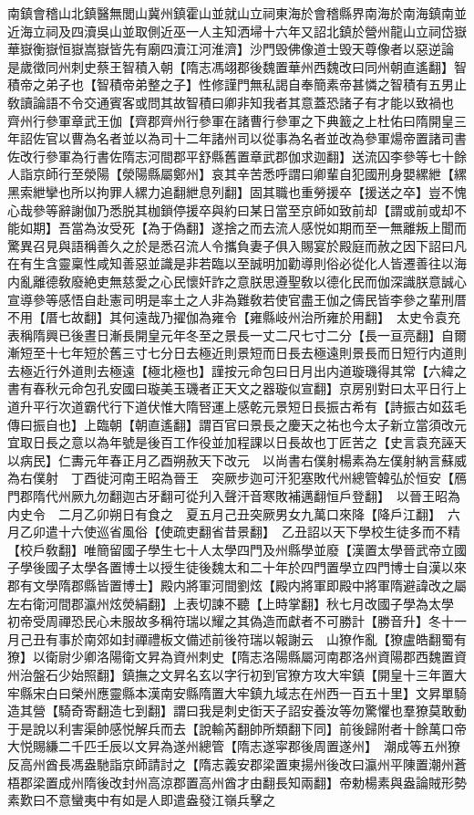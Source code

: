 南鎮會稽山北鎮醫無閭山冀州鎮霍山並就山立祠東海於會稽縣界南海於南海鎮南並近海立祠及四瀆吳山並取側近巫一人主知洒埽十六年又詔北鎮於營州龍山立祠岱嶽華嶽衡嶽恒嶽嵩嶽皆先有廟四瀆江河淮濟】沙門毁佛像道士毁天尊像者以惡逆論　是歲徵同州刺史蔡王智積入朝【隋志馮翊郡後魏置華州西魏改曰同州朝直遙翻】智積帝之弟子也【智積帝弟整之子】性修謹門無私謁自奉簡素帝甚憐之智積有五男止敎讀論語不令交通賓客或問其故智積曰卿非知我者其意蓋恐諸子有才能以致禍也　齊州行參軍章武王伽【齊郡齊州行參軍在諸曹行參軍之下典籖之上杜佑曰隋開皇三年詔佐官以曹為名者並以為司十二年諸州司以從事為名者並改為參軍煬帝置諸司書佐改行參軍為行書佐隋志河間郡平舒縣舊置章武郡伽求迦翻】送流囚李參等七十餘人詣京師行至滎陽【滎陽縣屬鄭州】哀其辛苦悉呼謂曰卿輩自犯國刑身嬰縲紲【縲黑索紲攣也所以拘罪人縲力追翻紲息列翻】固其職也重勞援卒【援送之卒】豈不愧心哉參等辭謝伽乃悉脱其枷鎖停援卒與約曰某日當至京師如致前却【謂或前或却不能如期】吾當為汝受死【為于偽翻】遂捨之而去流人感悦如期而至一無離叛上聞而驚異召見與語稱善久之於是悉召流人令攜負妻子俱入賜宴於殿庭而赦之因下詔曰凡在有生含靈稟性咸知善惡並識是非若臨以至誠明加勸導則俗必從化人皆遷善往以海内亂離德敎廢絶吏無慈愛之心民懷奸詐之意朕思遵聖敎以德化民而伽深識朕意誠心宣導參等感悟自赴憲司明是率土之人非為難敎若使官盡王伽之儔民皆李參之輩刑厝不用【厝七故翻】其何遠哉乃擢伽為雍令【雍縣岐州治所雍於用翻】　太史令袁充表稱隋興已後晝日漸長開皇元年冬至之景長一丈二尺七寸二分【長一亘亮翻】自爾漸短至十七年短於舊三寸七分日去極近則景短而日長去極遠則景長而日短行内道則去極近行外道則去極遠【極北極也】謹按元命包曰日月出内道璇璣得其常【六緯之書有春秋元命包孔安國曰璇美玉璣者正天文之器璇似宣翻】京房别對曰太平日行上道升平行次道霸代行下道伏惟大隋唘運上感乾元景短日長振古希有【詩振古如茲毛傳曰振自也】上臨朝【朝直遙翻】謂百官曰景長之慶天之祐也今太子新立當須改元宜取日長之意以為年號是後百工作役並加程課以日長故也丁匠苦之【史言袁充誣天以病民】仁夀元年春正月乙酉朔赦天下改元　以尚書右僕射楊素為左僕射納言蘇威為右僕射　丁酉徙河南王昭為晉王　突厥步迦可汗犯塞敗代州總管韓弘於恒安【鴈門郡隋代州厥九勿翻迦古牙翻可從刋入聲汗音寒敗補邁翻恒戶登翻】　以晉王昭為内史令　二月乙卯朔日有食之　夏五月己丑突厥男女九萬口來降【降戶江翻】　六月乙卯遣十六使巡省風俗【使疏吏翻省昔景翻】　乙丑詔以天下學校生徒多而不精【校戶敎翻】唯簡留國子學生七十人太學四門及州縣學並廢【漢置太學晉武帝立國子學後國子太學各置博士以授生徒後魏太和二十年於四門置學立四門博士自漢以來郡有文學隋郡縣皆置博士】殿内將軍河間劉炫【殿内將軍即殿中將軍隋避諱改之屬左右衛河間郡瀛州炫熒絹翻】上表切諫不聽【上時掌翻】秋七月改國子學為太學　初帝受周禪恐民心未服故多稱符瑞以耀之其偽造而獻者不可勝計【勝音升】冬十一月己丑有事於南郊如封禪禮板文備述前後符瑞以報謝云　山獠作亂【獠盧皓翻蜀有獠】以衛尉少卿洛陽衛文昇為資州刺史【隋志洛陽縣屬河南郡洛州資陽郡西魏置資州治盤石少始照翻】鎮撫之文昇名玄以字行初到官獠方攻大牢鎮【開皇十三年置大牢縣宋白曰榮州應靈縣本漢南安縣隋置大牢鎮九域志在州西一百五十里】文昇單騎造其營【騎奇寄翻造七到翻】謂曰我是刺史衘天子詔安養汝等勿驚懼也羣獠莫敢動于是說以利害渠帥感悦解兵而去【說輸芮翻帥所類翻下同】前後歸附者十餘萬口帝大悦賜縑二千匹壬辰以文昇為遂州總管【隋志遂寜郡後周置遂州】　潮成等五州獠反高州酋長馮盎馳詣京師請討之【隋志義安郡梁置東揚州後改曰瀛州平陳置潮州蒼梧郡梁置成州隋後改封州高涼郡置高州酋才由翻長知兩翻】帝勅楊素與盎論賊形勢素歎曰不意蠻夷中有如是人即遣盎發江嶺兵擊之
